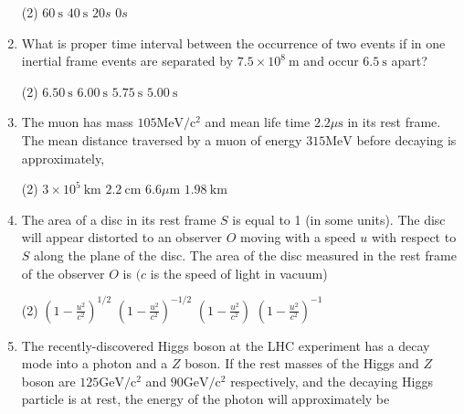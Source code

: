 \begin{enumerate}
\begin{tasks}(2)
	\task[\textbf{A.}] $60 \mathrm{~s}$
	\task[\textbf{B.}]$40 \mathrm{~s}$
	\task[\textbf{C.}]$20 s$
	\task[\textbf{D.}] $0 s$
\end{tasks}
	\item What is proper time interval between the occurrence of two events if in one inertial frame events are separated by $7.5 \times 10^{8} \mathrm{~m}$ and occur $6.5 \mathrm{~s}$ apart?
	{}
\begin{tasks}(2)
	\task[\textbf{A.}] $6.50 \mathrm{~s}$
	\task[\textbf{B.}]$6.00 \mathrm{~s}$
	\task[\textbf{C.}]$5.75 \mathrm{~s}$
	\task[\textbf{D.}]$5.00 \mathrm{~s}$
\end{tasks}
	\item The muon has mass $105 \mathrm{MeV} / \mathrm{c}^{2}$ and mean life time $2.2 \mu \mathrm{s}$ in its rest frame. The mean distance traversed by a muon of energy $315 \mathrm{MeV}$ before decaying is approximately,
{	}

\begin{tasks}(2)
	\task[\textbf{A.}] $3 \times 10^{5} \mathrm{~km}$ 
	\task[\textbf{B.}]$2.2 \mathrm{~cm}$
	\task[\textbf{C.}]$6.6 \mu \mathrm{m}$
	\task[\textbf{D.}]$1.98 \mathrm{~km}$
\end{tasks}

	\item The area of a disc in its rest frame $S$ is equal to 1 (in some units). The disc will appear distorted to an observer $O$ moving with a speed $u$ with respect to $S$ along the plane of the disc. The area of the disc measured in the rest frame of the observer $O$ is $(c$ is the speed of light in vacuum)
	{}

\begin{tasks}(2)
	\task[\textbf{A.}] $\left(1-\frac{u^{2}}{c^{2}}\right)^{1 / 2}$
	\task[\textbf{B.}]$\left(1-\frac{u^{2}}{c^{2}}\right)^{-1 / 2}$
	\task[\textbf{C.}]$\left(1-\frac{u^{2}}{c^{2}}\right)$
	\task[\textbf{D.}]$\left(1-\frac{u^{2}}{c^{2}}\right)^{-1}$
\end{tasks}

	\item The recently-discovered Higgs boson at the LHC experiment has a decay mode into a photon and a $Z$ boson. If the rest masses of the Higgs and $Z$ boson are $125 \mathrm{GeV} / \mathrm{c}^{2}$ and $90 \mathrm{GeV} / \mathrm{c}^{2}$ respectively, and the decaying Higgs particle is at rest, the energy of the photon will approximately be
	{}


\end{enumerate}
